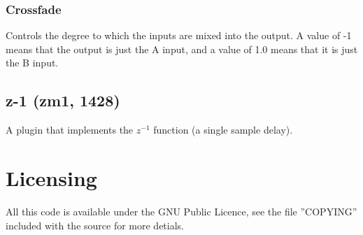 \documentclass[11pt]{article}
\begin{document}
\subsubsection*{Crossfade}
Controls the degree to which the inputs are mixed into the output. A
value of -1 means that the output is just the A input, and a value of 1.0
means that it is just the B input.\subsection{z-1 (zm1, 1428)\label{zm1}\label{id1428}}
A plugin that implements the $z^{-1}$ function (a single sample delay).\section{Licensing}
All this code is available under the GNU Public Licence, see the file {}''COPYING{}'' included with the source for more detials.
\end{document}
